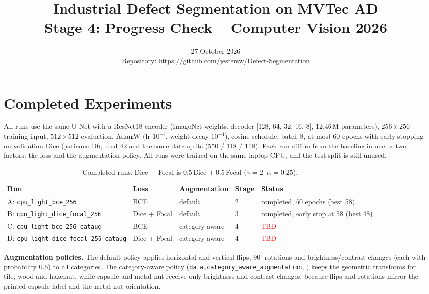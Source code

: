 \documentclass[11pt,a4paper]{article}
\title{\textbf{Industrial Defect Segmentation on MVTec AD}\\[2pt]\large Stage 4: Progress Check -- Computer Vision 2026}
\date{27 October 2026\\[2pt]\small Repository: \url{https://github.com/jestersw/Defect-Segmentation}}
\newcommand{\tbd}{\textcolor{red}{TBD}}
\begin{document}
\maketitle
\vspace{-1.5em}

\section{Completed Experiments}

All runs use the same U-Net with a ResNet18 encoder (ImageNet weights, decoder [128, 64, 32, 16, 8], 12.46\,M parameters), $256\times256$ training input, $512\times512$ evaluation, AdamW (lr $10^{-4}$, weight decay $10^{-4}$), cosine schedule, batch 8, at most 60 epochs with early stopping on validation Dice (patience 10), seed 42 and the same data splits (550 / 118 / 118). Each run differs from the baseline in one or two factors: the loss and the augmentation policy. All runs were trained on the same laptop CPU, and the test split is still unused.

\begin{table}[H]
\centering
\small
\begin{tabularx}{\linewidth}{llllX}
\toprule
Run & Loss & Augmentation & Stage & Status \\
\midrule
A: \texttt{cpu\_light\_bce\_256} & BCE & default & 2 & completed, 60 epochs (best 58) \\
B: \texttt{cpu\_light\_dice\_focal\_256} & Dice + Focal & default & 3 & completed, early stop at 58 (best 48) \\
C: \texttt{cpu\_light\_bce\_256\_cataug} & BCE & category-aware & 4 & \tbd \\
D: \texttt{cpu\_light\_dice\_focal\_256\_cataug} & Dice + Focal & category-aware & 4 & \tbd \\
\bottomrule
\end{tabularx}
\caption{Completed runs. Dice + Focal is $0.5\,$Dice $+\ 0.5\,$Focal ($\gamma=2$, $\alpha=0.25$).}
\label{tab:runs}
\end{table}

\textbf{Augmentation policies.} The default policy applies horizontal and vertical flips, $90^\circ$ rotations and brightness/contrast changes (each with probability 0.5) to all categories. The category-aware policy (\texttt{data.category\_aware\_augmentation}, ) keeps the geometric transforms for tile, wood and hazelnut, while capsule and metal nut receive only brightness and contrast changes, because flips and rotations mirror the printed capsule label and the metal nut orientation.
\end{document}
